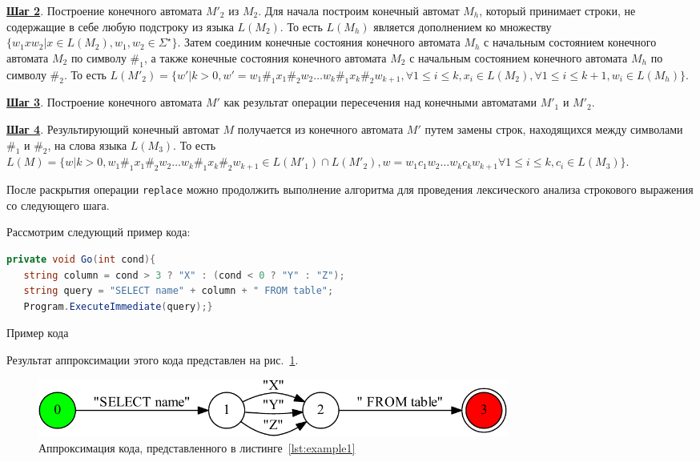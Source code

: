 \textbf{\underline{Шаг 2}}. Построение конечного автомата $M'_2$ из $M_2$. Для начала построим конечный автомат $M_h$, который принимает строки, не содержащие в себе любую подстроку из языка $L(M_2)$.  То есть $L(M_h)$ является дополнением ко множеству $\{w_{1}xw_{2} | x \in L(M_2), w_1, w_2 \in \Sigma^{\star}\}$. Затем соединим конечные состояния конечного автомата $M_h$ с начальным состоянием конечного автомата $M_2$ по символу $\#_1$, а также конечные состояния конечного автомата $M_2$ с начальным состоянием конечного автомата $M_h$ по символу $\#_2$. То есть $L(M'_2) = \{ w' | k > 0, w' = w_{1}\#_{1}x_{1}\#_{2}w_{2} \ldots w_{k}\#_{1}x_{k}\#_{2}w_{k+1}, \forall 1 \le i \le k, x_i \in L(M_2), \forall 1 \le i \le k+1, w_i \in L(M_h)\}$.

\textbf{\underline{Шаг 3}}. Построение конечного автомата $M'$ как результат операции пересечения над конечными автоматами $M'_1$ и $M'_2$.

\textbf{\underline{Шаг 4}}. Результирующий конечный автомат $M$ получается из конечного автомата $M'$ путем замены строк, находящихся между символами $\#_1$ и $\#_2$, на слова языка $L(M_3)$. То есть $L(M) = \{ w | k > 0, w_{1}\#_{1}x_{1}\#_{2}w_{2}\ldots w_{k}\#_{1}x_{k}\#_{2}w_{k+1} \in L(M'_1) \cap L(M'_2), w = w_{1}c_{1}w_{2}\ldots w_{k}c_{k}w_{k+1} \forall 1 \le i \le k, c_i \in L(M_3)\}$.

После раскрытия операции \verb|replace| можно продолжить выполнение алгоритма для проведения лексического анализа строкового выражения со следующего шага. 

Рассмотрим следующий пример кода:
\begin{listing}[H]
    \begin{lstlisting}[language=csharp]
 private void Go(int cond){
   string column = cond > 3 ? "X" : (cond < 0 ? "Y" : "Z");
   string query = "SELECT name" + column + " FROM table";
   Program.ExecuteImmediate(query);}
    \end{lstlisting}
\caption{Пример кода}
\label{lst:example1}
\end{listing}

Результат аппроксимации этого кода представлен на рис.~\ref{fig:example_appr}.
\begin{figure}[H]
\begin{center}
\includegraphics[width=0.75\textwidth]{Polubelova/tsql_test}
\caption{Аппроксимация кода, представленного в листинге~\ref{lst:example1}}
\label{fig:example_appr} 
\end{center}
\end{figure}

